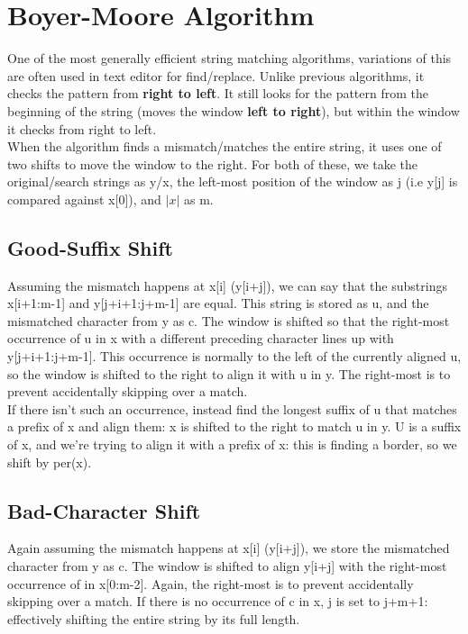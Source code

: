 \section{Boyer-Moore Algorithm}
One of the most generally efficient string matching algorithms, variations of this are often used in text editor for find/replace. Unlike previous algorithms, it checks the pattern from \textbf{right to left}. It still looks for the pattern from the beginning of the string (moves the window \textbf{left to right}), but within the window it checks from right to left. \\
When the algorithm finds a mismatch/matches the entire string, it uses one of two shifts to move the window to the right. For both of these, we take the original/search strings as y/x, the left-most position of the window as j (i.e y[j] is compared against x[0]), and $|x|$ as m. 

\subsection{Good-Suffix Shift}
Assuming the mismatch happens at x[i] (y[i+j]), we can say that the substrings\\ x[i+1:m-1] and y[j+i+1:j+m-1] are equal. This string is stored as u, and the mismatched character from y as c. The window is shifted so that the right-most occurrence of u in x with a different preceding character lines up with y[j+i+1:j+m-1]. This occurrence is normally to the left of the currently aligned u, so the window is shifted to the right to align it with u in y. The right-most is to prevent accidentally skipping over a match. \\
If there isn't such an occurrence, instead find the longest suffix of u that matches a prefix of x and align them: x is shifted to the right to match u in y. U is a suffix of x, and we're trying to align it with a prefix of x: this is finding a border, so we shift by per(x).

\subsection{Bad-Character Shift}
Again assuming the mismatch happens at x[i] (y[i+j]), we store the mismatched character from y as c. The window is shifted to align y[i+j] with the right-most occurrence of in x[0:m-2]. Again, the right-most is to prevent accidentally skipping over a match. If there is no occurrence of c in x, j is set to j+m+1: effectively shifting the entire string by its full length.

